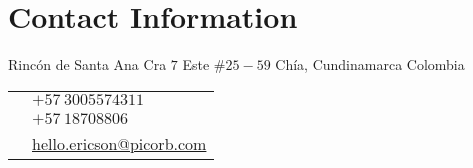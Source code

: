 
\section{Contact Information}
%
%
%
\begin{minipage}[t]{\textwidth-\rcollength-0.5cm}
Rinc\'{o}n de Santa Ana\newline
Cra $7$ Este $\# 25-59$\newline
Ch\'{i}a, Cundinamarca Colombia
\end{minipage}
\begin{minipage}[t]{\rcollength-0.5cm}
\colorbox{shade}{\textcolor{text1}{
\begin{tabular}[t]{c|l@{}}%
\raisebox{-3pt}{\PhoneHandset} 
& $+57\:3005574311$ \\
\raisebox{-3pt}{\Phone} 
& $+57\:18708806$ \\
\raisebox{-3pt}{\Envelope}
& 
\href{mailto:hello.ericson@picorb.com}{hello.ericson@picorb.com}\\
\end{tabular}
}}%
\end{minipage}


